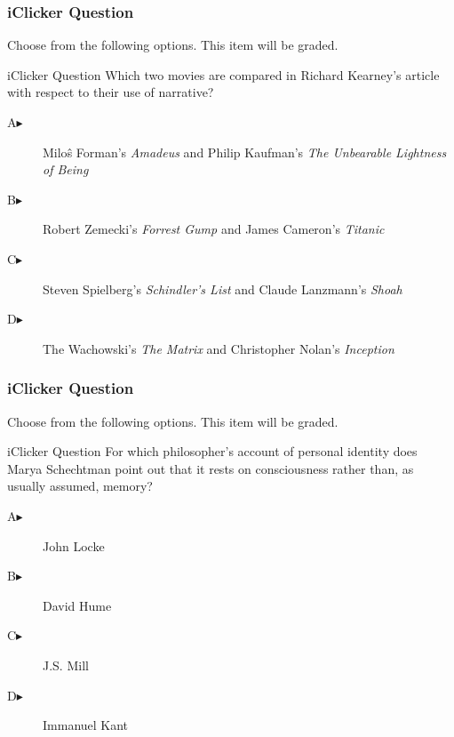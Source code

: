 \documentclass[xcolor=dvipsnames]{beamer}
\begin{document}
\begin{frame}
  \frametitle{iClicker Question}
Choose from the following options. This item will be graded.
\begin{block}{iClicker Question}
Which two movies are compared in Richard Kearney's article with
respect to their use of narrative?
\end{block}
\begin{description}
\item[A\hspace{.2in}$\blacktriangleright$] Milo{\^s} Forman's \emph{Amadeus} and Philip Kaufman's \emph{The Unbearable Lightness of Being}
\item[B\hspace{.2in}$\blacktriangleright$] Robert Zemecki's \emph{Forrest Gump} and James Cameron's \emph{Titanic}
\item[C\hspace{.2in}$\blacktriangleright$] Steven Spielberg's \emph{Schindler's List} and Claude Lanzmann's \emph{Shoah}
\item[D\hspace{.2in}$\blacktriangleright$] The Wachowski's \emph{The Matrix} and Christopher Nolan's \emph{Inception}
\end{description}
\end{frame}

\begin{frame}
  \frametitle{iClicker Question}
Choose from the following options. This item will be graded.
\begin{block}{iClicker Question}
For which philosopher's account of personal identity does Marya
Schechtman point out that it rests on consciousness rather than, as
usually assumed, memory?
\end{block}
\begin{description}
\item[A\hspace{.2in}$\blacktriangleright$] John Locke
\item[B\hspace{.2in}$\blacktriangleright$] David Hume
\item[C\hspace{.2in}$\blacktriangleright$] J.S. Mill
\item[D\hspace{.2in}$\blacktriangleright$] Immanuel Kant
\end{description}
\end{frame}
\end{document}
